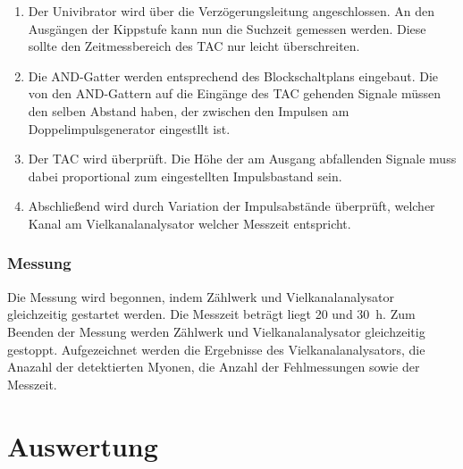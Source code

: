   \begin{enumerate}
    \item Der Univibrator wird über die Verzögerungsleitung angeschlossen. An den
    Ausgängen der Kippstufe kann nun die Suchzeit gemessen werden. Diese sollte den
    Zeitmessbereich des TAC nur leicht überschreiten.
    \item Die AND-Gatter werden entsprechend des Blockschaltplans eingebaut. Die von
    den AND-Gattern auf die Eingänge des TAC gehenden Signale müssen den selben Abstand
    haben, der zwischen den Impulsen am Doppelimpulsgenerator eingestllt ist.
    \item Der TAC wird überprüft. Die Höhe der am Ausgang abfallenden Signale muss
    dabei proportional zum eingestellten Impulsbastand sein.
    \item Abschließend wird durch Variation der Impulsabstände überprüft, welcher Kanal
    am Vielkanalanalysator welcher Messzeit entspricht.
  \end{enumerate}
  \subsubsection{Messung}
  Die Messung wird begonnen, indem Zählwerk und Vielkanalanalysator gleichzeitig
  gestartet werden. Die Messzeit beträgt liegt 20 und \SI{30}{\hour}.
  Zum Beenden der Messung werden Zählwerk und Vielkanalanalysator gleichzeitig gestoppt.
  Aufgezeichnet werden die Ergebnisse des Vielkanalanalysators, die Anazahl der detektierten
  Myonen, die Anzahl der Fehlmessungen sowie der Messzeit.

\section{Auswertung}

